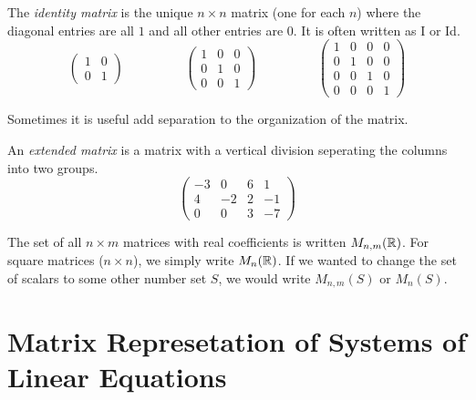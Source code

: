 \documentclass[fleqn]{report}
\begin{document}
\begin{defn}
The \emph{identity matrix} is the unique $n \times n$ matrix
(one for each $n$) where the diagonal entries are all
$1$ and all other entries are $0$. It is often written as I or 
Id.
\begin{displaymath}
\left( 
\begin{matrix}
1 & 0 \\
0 & 1
\end{matrix}
\right)
\hspace{2cm}
\left( 
\begin{matrix}
1 & 0 & 0 \\
0 & 1 & 0 \\
0 & 0 & 1 
\end{matrix}
\right)
\hspace{2cm}
\left( 
\begin{matrix}
1 & 0 & 0 & 0 \\
0 & 1 & 0 & 0 \\
0 & 0 & 1 & 0 \\
0 & 0 & 0 & 1
\end{matrix}
\right)
\end{displaymath}
\end{defn}

Sometimes it is useful add separation to the organization of
the matrix. 

\begin{defn}
An \emph{extended matrix} is a matrix with a vertical division
seperating the columns into two groups. 
\begin{displaymath}
\left(
\begin{array}{ccc|c}
-3 & 0 & 6 & 1 \\
4 & -2 & 2 & -1 \\
0 & 0 & 3 & -7 
\end{array}
\right) 
\end{displaymath}
\end{defn}

\begin{defn}
The set of all $n \times m$ matrices with real coefficients is
written $M_{n,m}(\mathbb{R})$. For square matrices ($n \times n$),
we simply write $M_n(\mathbb{R})$. If we wanted to change the set of
scalars to some other number set $S$, we would write
$M_{n,m}(S)$ or $M_n(S)$.
\end{defn}

\section{Matrix Represetation of Systems of Linear Equations}
\end{document}
